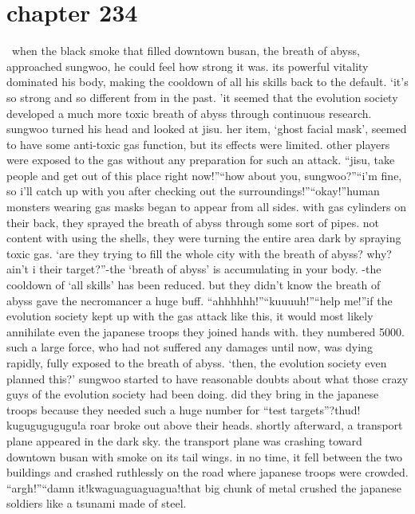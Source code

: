 \section{chapter 234}






 when the black smoke that filled downtown busan, the breath of abyss, approached sungwoo, he could feel how strong it was.
 its powerful vitality dominated his body, making the cooldown of all his skills back to the default.
‘it’s so strong and so different from in the past.
’it seemed that the evolution society developed a much more toxic breath of abyss through continuous research.
sungwoo turned his head and looked at jisu.
 her item, ‘ghost facial mask’, seemed to have some anti-toxic gas function, but its effects were limited.
 other players were exposed to the gas without any preparation for such an attack.
“jisu, take people and get out of this place right now!”“how about you, sungwoo?”“i’m fine, so i’ll catch up with you after checking out the surroundings!”“okay!”human monsters wearing gas masks began to appear from all sides.
with gas cylinders on their back, they sprayed the breath of abyss through some sort of pipes.
not content with using the shells, they were turning the entire area dark by spraying toxic gas.
‘are they trying to fill the whole city with the breath of abyss? why? ain’t i their target?”-the ‘breath of abyss’ is accumulating in your body.
-the cooldown of ‘all skills’ has been reduced.
but they didn’t know the breath of abyss gave the necromancer a huge buff.
“ahhhhhh!”“kuuuuh!”“help me!”if the evolution society kept up with the gas attack like this, it would most likely annihilate even the japanese troops they joined hands with.
 they numbered 5000.
 such a large force, who had not suffered any damages until now, was dying rapidly, fully exposed to the breath of abyss.
‘then, the evolution society even planned this?’
sungwoo started to have reasonable doubts about what those crazy guys of the evolution society had been doing.
 did they bring in the japanese troops because they needed such a huge number for “test targets”?thud! kugugugugugu!a roar broke out above their heads.
 shortly afterward, a transport plane appeared in the dark sky.
 the transport plane was crashing toward downtown busan with smoke on its tail wings.
 in no time, it fell between the two buildings and crashed ruthlessly on the road where japanese troops were crowded.
“argh!”“damn it!kwaguaguaguagua!that big chunk of metal crushed the japanese soldiers like a tsunami made of steel.
